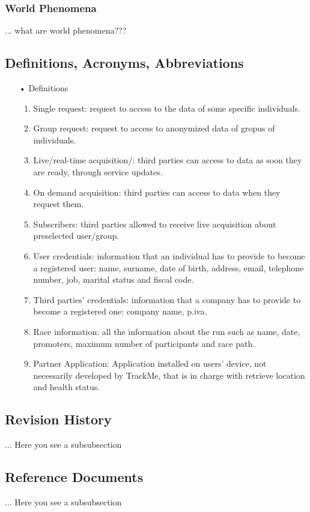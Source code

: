\subsubsection{World Phenomena}
... what are world phenomena???

\subsection{Definitions, Acronyms, Abbreviations}

\begin{enumerate}
\item[•] {\Large Definitions}
	\begin{enumerate}
		\item Single request: request to access to the data of some specific  individuals.
		\item Group request: request to access to anonymized data of gropus of individuals.
		\item Live/real-time acquisition/: third parties can access to data as soon they are ready, 				through service updates.
		\item On demand acquisition: third parties can access to data when they request 				them.
		\item Subscribers: third parties allowed to receive live acquisition about 						preselected	user/group.
		\item User credentials: information that an individual has to provide to become a 				registered user: name, surname, date of birth, address, email, telephone
			number, job, marital status and fiscal code. 
		\item Third parties' credentials: information that a company has to provide to 					become a registered one: company name, p.iva.
		\item Race information: all the information about the run such as name, date, promoters, 				maximum number of participants and race path.
		\item Partner Application: Application installed on users' device, not necessarily developed by TrackMe, that is in charge with retrieve location and health status. 
	\end{enumerate}
\end{enumerate}
	
\subsection{Revision History}
... Here you see a subsubsection
\subsection{Reference Documents}
... Here you see a subsubsection
